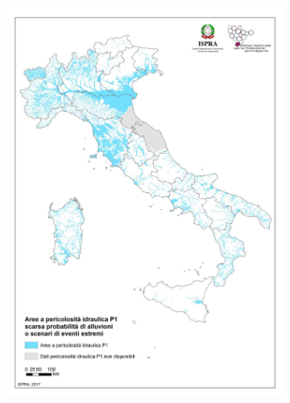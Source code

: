 \begin{figure}
\begin{subfigure}{.475\textwidth}
        \includegraphics[width=\textwidth]{figures/ita_flood/p1}
    \end{subfigure}
    \begin{subfigure}{.475\textwidth}
        \caption{}\label{fig:ispra_ita_flood/d}

\end{subfigure}
\end{figure}
